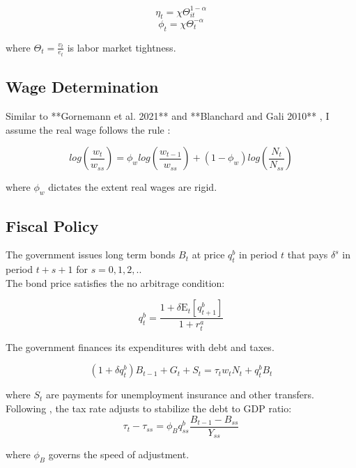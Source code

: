 \documentclass[\econtexRoot/HAFiscal]{subfiles}
\begin{document}
$$\eta_{t} = \chi \Theta_{it}^{1-\alpha} $$
$$ \phi_{t} = \chi \Theta_{t}^{-\alpha} $$ 
\vspace{.1cm}

where $\Theta_{t} = \frac{v_{t}}{e_{t}}$ is labor market tightness.



\subsection{Wage Determination }


Similar to **Gornemann et al. 2021** and **Blanchard and Gali 2010** , I assume the real wage follows the rule :

$$log\left(\frac{w_{t}}{w_{ss}}\right)  = \phi_w log\left( \frac{ w_{t-1}}{ w_{ss}} \right) +   (1 - \phi_w) log\left( \frac{N_{t}}{N_{ss}}\right)$$
\vspace{.2cm}

where $\phi_w$ dictates the extent real wages are rigid. 



\subsection{Fiscal Policy}

The government issues long term bonds $B_{t}$ at price $q^{b}_{t}$ in period $t$ that pays $\delta^{s}$ in period $t+s+1$ for $s = 0,1,2, ..$ \\

The bond price satisfies the no arbitrage condition:

$$q^{b}_{t} = \frac{ 1  + \delta \mathrm{E}_{t}[q^{b}_{t+1}]}{1+r^{a}_{t}}$$ 


The government finances its expenditures with debt and taxes. 

$$ (1 + \delta q^{b}_{t})B_{t-1} + G_{t}  + S_{t} = \tau_{t} w_{t} N_{t}+ q^{b}_{t}B_{t}$$
\vspace{.4cm}

where $ S_{t}$ are payments for unemployment insurance and other transfers. \\

Following \cite{arsJumpsHumps}, the tax rate adjusts to stabilize the debt to GDP ratio:\\
$$ \tau_{t} - \tau_{ss} = \phi_{B} q^{b}_{ss} \frac{B_{t-1} - B_{ss} }{Y_{ss}}$$

\vspace{.4cm}
where $\phi_{B}$ governs the speed of adjustment. 
\end{document}
